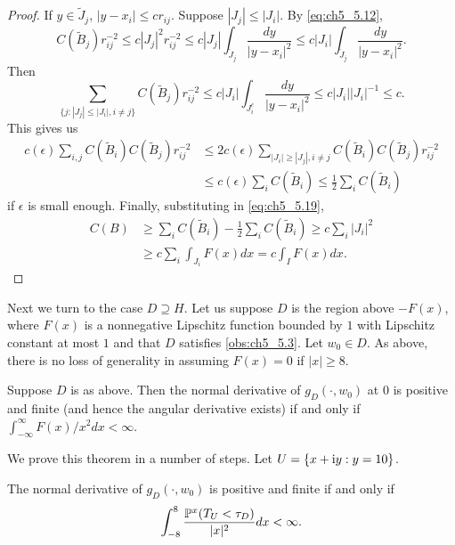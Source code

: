 \begin{proof}
If $y \in \widetilde{J}_j$, $|y - x_i| \leq cr_{ij}$. Suppose $|J_j| \leq |J_i|$. By \eqref{eq:ch5_5.12},
\[
    C(\widetilde{B}_j)r_{ij}^{-2} \leq c|J_j|^2r_{ij}^{-2} \leq c|J_j| \int_{\widetilde{J}_j} \frac{dy}{|y - x_i|^2} \leq c|J_i| \int_{\widetilde{J}_j} \frac{dy}{|y - x_i|^2}.
\]
Then
\[
    \sum_{\{j:|J_j|\leq|J_i|,i\neq j\}} C(\widetilde{B}_j)r_{ij}^{-2} \leq c|J_i| \int_{J_i^c} \frac{dy}{|y - x_i|^2} \leq c|J_i||J_i|^{-1} \leq c.
\]
This gives us
\begin{align*}
    c(\epsilon) \sum_{i,j} C(\widetilde{B}_i)C(\widetilde{B}_j)r_{ij}^{-2} &\leq 2c(\epsilon) \sum_{|J_i|\geq|J_j|,i\neq j} C(\widetilde{B}_i)C(\widetilde{B}_j)r_{ij}^{-2} \\
    &\leq c(\epsilon)\sum_i C(\widetilde{B}_i) \leq \frac{1}{2}\sum_i C(\widetilde{B}_i)
\end{align*}
if $\epsilon$ is small enough. Finally, substituting in \eqref{eq:ch5_5.19},
\begin{align*}
    C(B) &\geq \sum_i C(\widetilde{B}_i)-\frac{1}{2}\sum_i C(\widetilde{B}_i) \geq c\sum_i |J_i|^2 \\
    &\geq c\sum_i \int_{J_i} F(x)dx = c\int_I F(x)dx.
\end{align*}
\end{proof}


Next we turn to the case $D \supseteq H$. Let us suppose $D$ is the region above $-F(x)$, where $F(x)$ is a nonnegative Lipschitz function bounded by $1$ with Lipschitz constant at most $1$ and that $D$ satisfies \eqref{obs:ch5_5.3}. Let $w_0 \in D$. As above, there is no loss of generality in assuming $F(x) = 0$ if $|x| \geq 8$.

\begin{theorem}\label{thm:ch5_5.8}
Suppose $D$ is as above. Then the normal derivative of $g_D(\cdot,w_0)$ at $0$ is positive and finite (and hence the angular derivative exists) if and only if $\int_{-\infty}^{\infty} F(x)/x^2dx < \infty$.
\end{theorem}

We prove this theorem in a number of steps. Let $U = \{x+\im y : y = 10\}$.

\begin{proposition}\label{prop:ch5_5.9}
The normal derivative of $g_D(\cdot,w_0)$ is positive and finite if and only if
\[
    \int_{-8}^8 \frac{\P^x(T_U < \tau_D)}{|x|^2}dx < \infty.
\]
\end{proposition}

